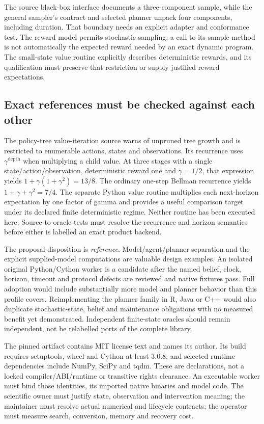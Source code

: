 The source black-box interface documents a three-component sample, while the
general sampler's contract and selected planner unpack four components,
including duration. That boundary needs an explicit adapter and conformance
test. The reward model permits stochastic sampling; a call to its sample method
is not automatically the expected reward needed by an exact dynamic program.
The small-state value routine explicitly describes deterministic rewards, and
its qualification must preserve that restriction or supply justified reward
expectations. \cite{exec23_pomdppy_sources}

\subsection{Exact references must be checked against each other}
\label{exec23:pomdppy-decision}
The policy-tree value-iteration source warns of unpruned tree growth and is
restricted to enumerable actions, states and observations. Its recurrence uses
$\gamma^{\text{depth}}$ when multiplying a child value. At three stages with a
single state/action/observation, deterministic reward one and $\gamma=1/2$, that
expression yields $1+\gamma(1+\gamma^2)=13/8$. The ordinary one-step Bellman
recurrence yields $1+\gamma+\gamma^2=7/4$. The separate Python value routine
multiplies each next-horizon expectation by one factor of gamma and provides
a useful comparison target under its declared finite deterministic regime.
Neither routine has been executed here. Source-to-oracle tests must resolve
the recurrence and horizon semantics before either is labelled an exact
product backend. \cite{exec23_pomdppy_sources,exec23_pomdppy_reference}

The proposal disposition is \emph{reference}. Model/agent/planner separation
and the explicit supplied-model computations are valuable design examples.
An isolated original Python/Cython worker is a candidate after the named belief,
clock, horizon, timeout and protocol defects are reviewed and native fixtures
pass. Full adoption would include substantially more model and planner behavior
than this profile covers. Reimplementing the planner family in R, Java or C++
would also duplicate stochastic-state, belief and maintenance obligations with
no measured benefit yet demonstrated. Independent finite-state oracles should
remain independent, not be relabelled ports of the complete library.

The pinned artifact contains MIT license text and names its author. Its build
requires setuptools, wheel and Cython at least 3.0.8, and selected runtime
dependencies include NumPy, SciPy and tqdm. These are declarations, not a
locked compiler/ABI/runtime or transitive rights clearance. An executable worker
must bind those identities, its imported native binaries and model code. The
scientific owner must justify state, observation and intervention meaning; the
maintainer must resolve actual numerical and lifecycle contracts; the operator
must measure search, conversion, memory and recovery cost.
\cite{exec23_pomdppy_sources}

